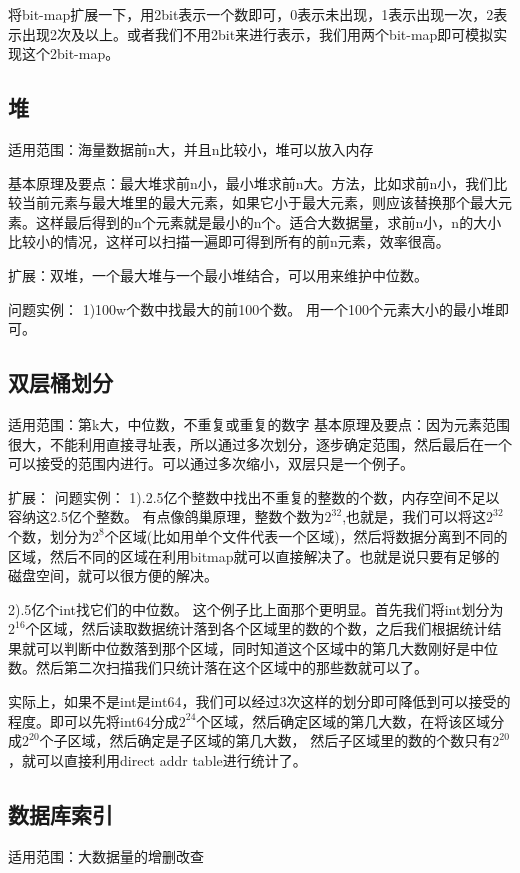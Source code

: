 将bit-map扩展一下，用2bit表示一个数即可，0表示未出现，1表示出现一次，2表示出现2次及以上。或者我们不用2bit来进行表示，我们用两个bit-map即可模拟实现这个2bit-map。

\subsection{堆}
适用范围：海量数据前n大，并且n比较小，堆可以放入内存

基本原理及要点：最大堆求前n小，最小堆求前n大。方法，比如求前n小，我们比较当前元素与最大堆里的最大元素，如果它小于最大元素，则应该替换那个最大元素。这样最后得到的n个元素就是最小的n个。适合大数据量，求前n小，n的大小比较小的情况，这样可以扫描一遍即可得到所有的前n元素，效率很高。

扩展：双堆，一个最大堆与一个最小堆结合，可以用来维护中位数。

问题实例：
1)100w个数中找最大的前100个数。
用一个100个元素大小的最小堆即可。

\subsection{双层桶划分}
适用范围：第k大，中位数，不重复或重复的数字
基本原理及要点：因为元素范围很大，不能利用直接寻址表，所以通过多次划分，逐步确定范围，然后最后在一个可以接受的范围内进行。可以通过多次缩小，双层只是一个例子。

扩展：
问题实例：
1).2.5亿个整数中找出不重复的整数的个数，内存空间不足以容纳这2.5亿个整数。
有点像鸽巢原理，整数个数为$2^32$,也就是，我们可以将这$2^32$个数，划分为$2^8$个区域(比如用单个文件代表一个区域)，然后将数据分离到不同的区域，然后不同的区域在利用bitmap就可以直接解决了。也就是说只要有足够的磁盘空间，就可以很方便的解决。

2).5亿个int找它们的中位数。
这个例子比上面那个更明显。首先我们将int划分为$2^16$个区域，然后读取数据统计落到各个区域里的数的个数，之后我们根据统计结果就可以判断中位数落到那个区域，同时知道这个区域中的第几大数刚好是中位数。然后第二次扫描我们只统计落在这个区域中的那些数就可以了。

实际上，如果不是int是int64，我们可以经过3次这样的划分即可降低到可以接受的程度。即可以先将int64分成$2^24$个区域，然后确定区域的第几大数，在将该区域分成$2^20$个子区域，然后确定是子区域的第几大数，
然后子区域里的数的个数只有$2^20$，就可以直接利用direct
 addr table进行统计了。

\subsection{数据库索引}
适用范围：大数据量的增删改查


